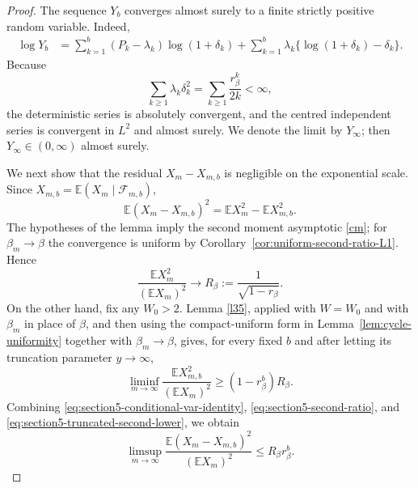 \documentclass[10pt,a4paper]{amsart}
\begin{document}
\begin{proof}
The sequence $Y_b$ converges almost surely to a finite strictly positive random
variable.  Indeed,
\begin{align*}
\log Y_b
&=\sum_{k=1}^b (P_k-\lambda_k)\log(1+\delta_k)
  +\sum_{k=1}^b \lambda_k\{\log(1+\delta_k)-\delta_k\}.
\end{align*}
Because
\begin{equation}\label{eq:section5-l2-summable}
  \sum_{k\ge1}\lambda_k\delta_k^2
  =\sum_{k\ge1}\frac{r_\beta^k}{2k}<\infty,
\end{equation}
the deterministic series is absolutely convergent, and the centred independent
series is convergent in $L^2$ and almost surely.  We denote the limit by
$Y_\infty$; then $Y_\infty\in(0,\infty)$ almost surely.

We next show that the residual $X_m-X_{m,b}$ is negligible on the exponential
scale.  Since $X_{m,b}=\mathbb E(X_m\mid\mathcal F_{m,b})$,
\begin{equation}\label{eq:section5-conditional-var-identity}
  \mathbb E(X_m-X_{m,b})^2
  =\mathbb E X_m^2-\mathbb E X_{m,b}^2.
\end{equation}
The hypotheses of the lemma imply the second moment asymptotic \eqref{cm}; for
$\beta_m\to\beta$ the convergence is uniform by
Corollary~\ref{cor:uniform-second-ratio-L1}.  Hence
\begin{equation}\label{eq:section5-second-ratio}
  \frac{\mathbb E X_m^2}{(\mathbb E X_m)^2}
  \longrightarrow
  R_\beta:=\frac1{\sqrt{1-r_\beta}}.
\end{equation}
On the other hand, fix any $W_0>2$.  Lemma \ref{l35}, applied with $W=W_0$
and with $\beta_m$ in place of $\beta$, and then using the compact-uniform form in
Lemma~\ref{lem:cycle-uniformity} together with $\beta_m\to\beta$,
gives, for every fixed $b$ and after letting its truncation parameter $y\to\infty$,
\begin{equation}\label{eq:section5-truncated-second-lower}
  \liminf_{m\to\infty}\frac{\mathbb E X_{m,b}^2}{(\mathbb E X_m)^2}
  \ge (1-r_\beta^b)R_\beta .
\end{equation}
Combining \eqref{eq:section5-conditional-var-identity},
\eqref{eq:section5-second-ratio}, and \eqref{eq:section5-truncated-second-lower},
we obtain
\begin{equation}\label{eq:section5-residual-variance}
  \limsup_{m\to\infty}
  \frac{\mathbb E(X_m-X_{m,b})^2}{(\mathbb E X_m)^2}
  \le R_\beta r_\beta^b .
\end{equation}


\end{proof}
\end{document}
